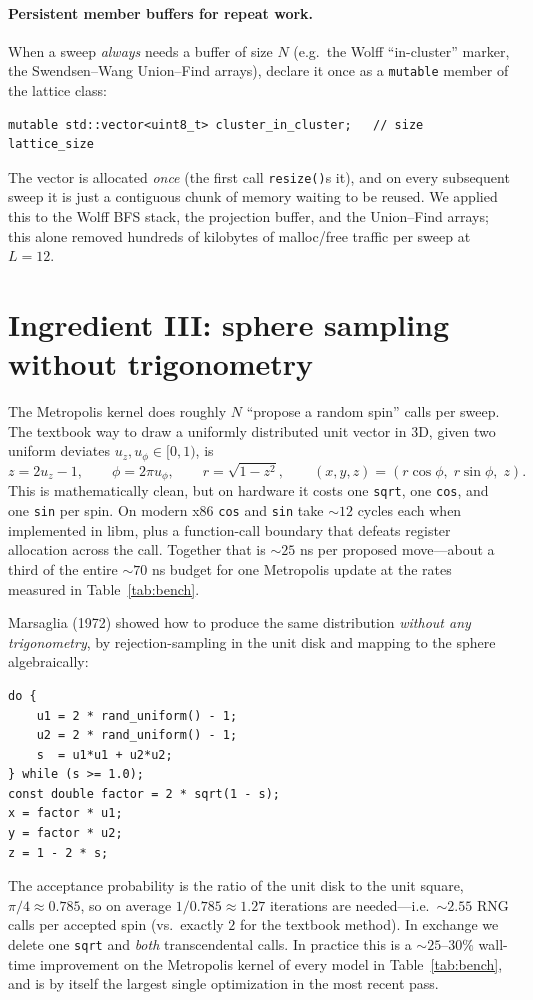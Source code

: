 \documentclass[11pt,letterpaper]{article}
\begin{document}
\paragraph{Persistent member buffers for repeat work.}  When a sweep
\emph{always} needs a buffer of size $N$ (e.g.\ the Wolff
``in-cluster'' marker, the Swendsen--Wang Union--Find arrays), declare it
once as a \texttt{mutable} member of the lattice class:
\begin{lstlisting}
mutable std::vector<uint8_t> cluster_in_cluster;   // size lattice_size
\end{lstlisting}
The vector is allocated \emph{once} (the first call \texttt{resize()}s
it), and on every subsequent sweep it is just a contiguous chunk of
memory waiting to be reused.  We applied this to the Wolff BFS stack,
the projection buffer, and the Union--Find arrays; this alone removed
hundreds of kilobytes of malloc/free traffic per sweep at $L = 12$.

\section{Ingredient III: sphere sampling without trigonometry}
\label{sec:marsaglia}

The Metropolis kernel does roughly $N$ ``propose a random spin'' calls
per sweep.  The textbook way to draw a uniformly distributed unit
vector in 3D, given two uniform deviates $u_z, u_\phi \in [0,1)$, is
\[
   z   = 2 u_z - 1, \qquad
   \phi = 2\pi u_\phi, \qquad
   r   = \sqrt{1 - z^2}, \qquad
   (x, y, z) = (r \cos\phi,\; r\sin\phi,\; z).
\]
This is mathematically clean, but on hardware it costs one
\texttt{sqrt}, one \texttt{cos}, and one \texttt{sin} per spin.  On
modern x86 \texttt{cos} and \texttt{sin} take $\sim 12$ cycles each
when implemented in libm, plus a function-call boundary that
defeats register allocation across the call.  Together that is
$\sim 25$ ns per proposed move---about a third of the entire
$\sim 70$ ns budget for one Metropolis update at the rates measured
in Table~\ref{tab:bench}.

Marsaglia (1972) showed how to produce the same distribution
\emph{without any trigonometry}, by rejection-sampling in the unit
disk and mapping to the sphere algebraically:
\begin{lstlisting}
do {
    u1 = 2 * rand_uniform() - 1;
    u2 = 2 * rand_uniform() - 1;
    s  = u1*u1 + u2*u2;
} while (s >= 1.0);
const double factor = 2 * sqrt(1 - s);
x = factor * u1;
y = factor * u2;
z = 1 - 2 * s;
\end{lstlisting}
The acceptance probability is the ratio of the unit disk to the unit
square, $\pi/4 \approx 0.785$, so on average $1/0.785 \approx 1.27$
iterations are needed---i.e.\ $\sim 2.55$ RNG calls per accepted
spin (vs.\ exactly $2$ for the textbook method).  In exchange we
delete one \texttt{sqrt} and \emph{both} transcendental calls.  In
practice this is a $\sim 25$--$30\%$ wall-time improvement on the
Metropolis kernel of every model in Table~\ref{tab:bench}, and is by
itself the largest single optimization in the most recent pass.
\end{document}
